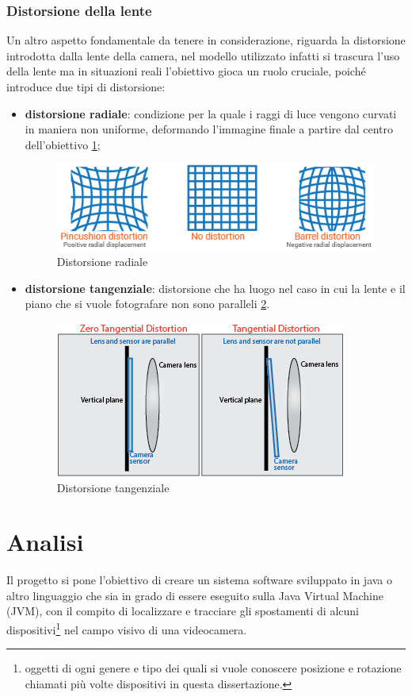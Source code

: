 \documentclass[12pt,a4paper,openright,twoside]{book}
\begin{document}
\subsection{Distorsione della lente}
Un altro aspetto fondamentale da tenere in considerazione, riguarda la distorsione introdotta dalla lente della camera, nel modello utilizzato infatti si trascura l'uso della lente ma in situazioni reali l'obiettivo gioca un ruolo cruciale, poiché introduce due tipi di distorsione:
\begin{itemize}
	\item \textbf{distorsione radiale}: condizione per la quale i raggi di luce vengono curvati in maniera non uniforme, deformando l'immagine finale a partire dal centro dell'obiettivo \ref{fig:radial_distortion}; 
	\begin{figure}[h!]
		\centering
		\includegraphics[width=0.6\linewidth]{./figures/radial_distortion.png}
		\caption{Distorsione radiale}
		\label{fig:radial_distortion}
	\end{figure}
	\item  \textbf{distorsione tangenziale}: distorsione che ha luogo nel caso in cui la lente e il piano che si vuole fotografare non sono paralleli \ref{fig:tangential_distortion}.
	\begin{figure}[h!]
		\centering
		\includegraphics[width=0.5\linewidth]{./figures/tangential_distortion.png}
		\caption{Distorsione tangenziale}
		\label{fig:tangential_distortion}
	\end{figure}
\end{itemize} 

\chapter{Analisi}
Il progetto si pone l'obiettivo di creare un sistema software sviluppato in java o altro linguaggio che sia in grado di essere eseguito sulla Java Virtual Machine (JVM), con il compito di localizzare e tracciare gli spostamenti di alcuni dispositivi\footnote{oggetti di ogni genere e tipo dei quali si vuole conoscere posizione e rotazione chiamati più volte dispositivi in questa dissertazione.} nel campo visivo di una videocamera.
\end{document}
